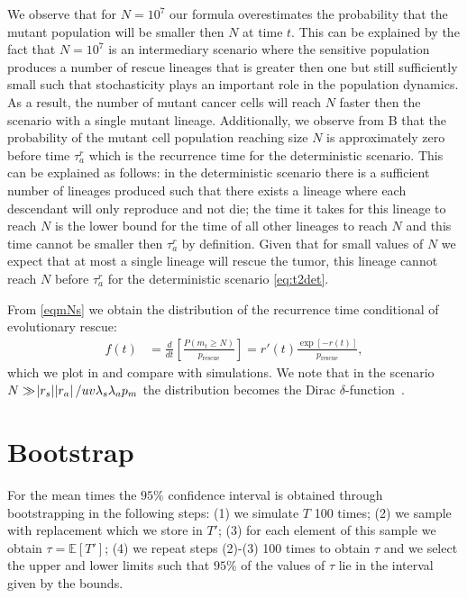 \documentclass[12pt]{extarticle}
\newcommand{\presc}{p_\text{rescue}}
\renewcommand{\Delta}{r}
\begin{document}
\begin{appendices}
We observe that for $N=10^7$ our formula overestimates the probability that the mutant population will be smaller then $N$ at time $t$.  This can be explained by the fact that $N=10^7$ is an intermediary scenario where the sensitive population produces a number of rescue lineages that is greater then one but still sufficiently small such that stochasticity plays an important role in the population dynamics. As a result, the number of mutant cancer cells will reach $N$ faster then the scenario with a single mutant lineage. Additionally, we observe from B that the probability of the mutant cell population reaching size $N$ is approximately zero before time $\tau_a^r$ which is the recurrence time for the deterministic scenario. This can be explained as follows: in the deterministic scenario there is a sufficient number of lineages produced such that there exists a lineage where each descendant will only reproduce and not die; the time it takes for this lineage to reach $N$ is the lower bound for the time of all other lineages to reach $N$ and this time cannot be smaller then $\tau_a^r$ by definition. Given that for small values of $N$ we expect that at most a single lineage will rescue the tumor, this lineage cannot reach $N$ before $\tau_a^r$ for the deterministic scenario \cref{eq:t2det}.

From  \cref{eqmNs} we obtain the distribution of the recurrence time conditional of evolutionary rescue: %
\begin{align}\label{distribution}
f\left(t\right)&=\frac{d}{dt}\left[\frac{P\left(m_t\geq N\right)}{\presc}\right]=r'\left(t\right)\frac{\exp\left[-r\left(t\right)\right]}{\presc},
\end{align}
which we plot in  and compare with simulations. We note that in the scenario $N\gg\abs{\Delta_s}\abs{\Delta_a}/uv\lambda_s\lambda_ap_m$ the distribution becomes the Dirac $\delta$-function~\citep{barton1989elements}.
\section{Bootstrap}
For the mean times the $95\%$ confidence interval is obtained through bootstrapping in the following steps: (1) we simulate $T$ 100 times; (2) we sample with replacement which we store in $T'$; (3) for each element of this sample we obtain $\tau=\mathbb{E}\left[T'\right]$; (4) we repeat steps (2)-(3) 100 times to obtain $\tau$ and we select the upper and lower limits such that $95\%$ of the values of $\tau$ lie in the interval given by the bounds.


\end{appendices}
\end{document}
